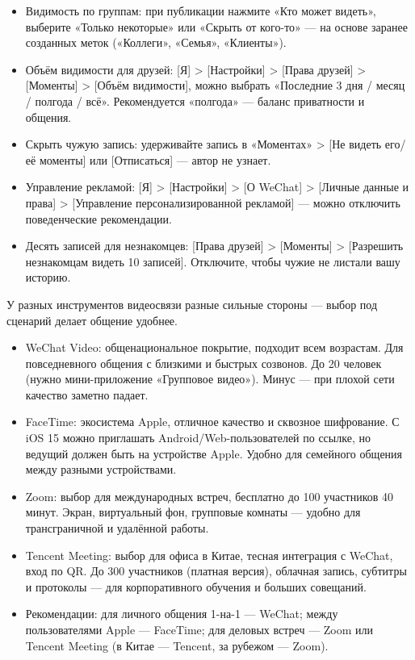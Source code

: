 
\begin{itemize}
  \item Видимость по группам: при публикации нажмите «Кто может видеть», выберите «Только некоторые» или «Скрыть от кого-то» — на основе заранее созданных меток («Коллеги», «Семья», «Клиенты»).
  \item Объём видимости для друзей: [Я] > [Настройки] > [Права друзей] > [Моменты] > [Объём видимости], можно выбрать «Последние 3 дня / месяц / полгода / всё». Рекомендуется «полгода» — баланс приватности и общения.
  \item Скрыть чужую запись: удерживайте запись в «Моментах» > [Не видеть его/её моменты] или [Отписаться] — автор не узнает.
  \item Управление рекламой: [Я] > [Настройки] > [О WeChat] > [Личные данные и права] > [Управление персонализированной рекламой] — можно отключить поведенческие рекомендации.
  \item Десять записей для незнакомцев: [Права друзей] > [Моменты] > [Разрешить незнакомцам видеть 10 записей]. Отключите, чтобы чужие не листали вашу историю.
\end{itemize}


У разных инструментов видеосвязи разные сильные стороны — выбор под сценарий делает общение удобнее.

\begin{itemize}
  \item WeChat Video: общенациональное покрытие, подходит всем возрастам. Для повседневного общения с близкими и быстрых созвонов. До 20 человек (нужно мини-приложение «Групповое видео»). Минус — при плохой сети качество заметно падает.
  \item FaceTime: экосистема Apple, отличное качество и сквозное шифрование. С iOS 15 можно приглашать Android/Web-пользователей по ссылке, но ведущий должен быть на устройстве Apple. Удобно для семейного общения между разными устройствами.
  \item Zoom: выбор для международных встреч, бесплатно до 100 участников 40 минут. Экран, виртуальный фон, групповые комнаты — удобно для трансграничной и удалённой работы.
  \item Tencent Meeting: выбор для офиса в Китае, тесная интеграция с WeChat, вход по QR. До 300 участников (платная версия), облачная запись, субтитры и протоколы — для корпоративного обучения и больших совещаний.
  \item Рекомендации: для личного общения 1-на-1 — WeChat; между пользователями Apple — FaceTime; для деловых встреч — Zoom или Tencent Meeting (в Китае — Tencent, за рубежом — Zoom).
\end{itemize}

